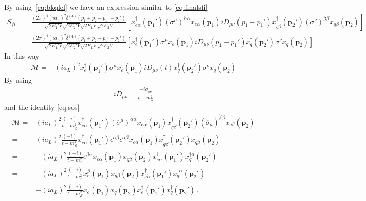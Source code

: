 By using~\eqref{eq:bkqlel} we have an expression similar to \eqref{eq:finalsfi}
\begin{align}
      S_{fi}
    =&\frac{(2\pi)^4(ia_L)^2\delta^{(4)}\left(p_1+p_2-p_1'-p_2'\right) }{\sqrt{2 E_1'V}\sqrt{2 E_2'V}\sqrt{2 E_1V}\sqrt{2 E_2V}}
 \left[ x^{\dagger}_{e\dot{\alpha}}(\mathbf{p}_1')\left( \overline{\sigma}^{\mu} \right)^{\dot{\alpha}\alpha}x_{e \alpha}(\mathbf{p}_1)  i D_{\mu\nu}\left(p_1-p_1'\right)x^{\dagger}_{q\dot{\beta}}(\mathbf{p}_2') \left( \overline{\sigma}^{\nu} \right)^{\dot{\beta}\beta}x_{q \beta}(\mathbf{p}_2)\right] \nonumber\\
=&\frac{(2\pi)^4(ia_L)^2\delta^{(4)}\left(p_1+p_2-p_1'-p_2'\right) }{\sqrt{2 E_1'V}\sqrt{2 E_2'V}\sqrt{2 E_1V}\sqrt{2 E_2V}}
  \left[ x_e^{\dagger}(\mathbf{p}_1') \overline{\sigma}^{\mu}x_e(\mathbf{p}_1)  i D_{\mu\nu}\left(p_1-p_1'\right)x_q^{\dagger}(\mathbf{p}_2') \overline{\sigma}^{\nu} x_q(\mathbf{p}_2)\right].
\end{align}
In this way
\begin{align}
  \mathcal{M}=&(ia_L)^2 x_e^{\dagger}(\mathbf{p}_1') \overline{\sigma}^{\mu}x_e(\mathbf{p}_1)  i D_{\mu\nu}(t)x_q^{\dagger}(\mathbf{p}_2') \overline{\sigma}^{\nu} x_q(\mathbf{p}_2)
\end{align}
By using
\begin{align}
  iD_{\mu\nu}=\frac{-ig_{\mu\nu}}{t-m_Z^2}
\end{align}
and the identity \eqref{eq:sos}
\begin{align}
\mathcal{M}=&(ia_L)^2 \frac{(-i)}{t-m_Z^2} x^{\dagger}_{e\dot{\alpha}}(\mathbf{p}_1')\left( \overline{\sigma}^{\mu} \right)^{\dot{\alpha}\alpha}x_{e \alpha}(\mathbf{p}_1)  x^{\dagger}_{q\dot{\beta}}(\mathbf{p}_2') \left( \overline{\sigma}_{\mu} \right)^{\dot{\beta}\beta}x_{q \beta}(\mathbf{p}_2) \nonumber\\
=&(ia_L)^2 \frac{(-i)}{t-m_Z^2} x^{\dagger}_{e\dot{\alpha}}(\mathbf{p}_1')\epsilon^{\alpha\beta}\epsilon^{\dot{\alpha}\dot{\beta}}x_{e \alpha}(\mathbf{p}_1)  x^{\dagger}_{q\dot{\beta}}(\mathbf{p}_2')x_{q \beta}(\mathbf{p}_2) \nonumber\\
=&-(ia_L)^2 \frac{(-i)}{t-m_Z^2}\epsilon^{\beta\alpha}x_{e \alpha}(\mathbf{p}_1)x_{q \beta}(\mathbf{p}_2) x^{\dagger}_{e\dot{\alpha}}(\mathbf{p}_1')  x^{\dagger\dot{\alpha}}_{q}(\mathbf{p}_2') \nonumber\\
=&-(ia_L)^2 \frac{(-i)}{t-m_Z^2}x^{\beta}_e(\mathbf{p}_1)x_{q \beta}(\mathbf{p}_2) x^{\dagger}_{e\dot{\alpha}}(\mathbf{p}_1')  x^{\dagger\dot{\alpha}}_{q}(\mathbf{p}_2') \nonumber\\
=&-(ia_L)^2 \frac{(-i)}{t-m_Z^2}x_e(\mathbf{p}_1)x_q(\mathbf{p}_2) x^{\dagger}_e(\mathbf{p}_1')  x^{\dagger}_q(\mathbf{p}_2') \,.
\end{align}
